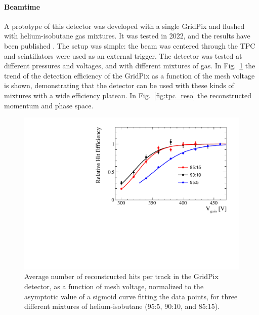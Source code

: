 \begin{refsection}
        \paragraph{Beamtime}
        A prototype of this detector was developed with a single GridPix and flushed with helium-isobutane gas mixtures. 
        It was tested in 2022, and the results have been published \cite{muEDM:PSI:GridPix}.
        The setup was simple: the beam was centered through the TPC and scintillators were used as an external trigger.
        The detector was tested at different pressures and voltages, and with different mixtures of gas.
        In Fig.~\ref{fig:gridpix_plateau} the trend of the detection efficiency of the GridPix as a function of the mesh voltage is shown, demonstrating that the detector can be used with these kinds of mixtures with a wide efficiency plateau.
        In Fig.~\ref{fig:tpc_reso} the reconstructed momentum and phase space.\\

        \begin{figure}
            \centering
            \includegraphics[width=0.5 \textwidth]{Figures/muEDM/gridpix_plateau.pdf}    
            \caption[muEDM: \grid efficiency]{Average number of reconstructed hits per track in the GridPix detector, as a function of mesh voltage, normalized to the asymptotic value of a sigmoid curve fitting the data points, for three different mixtures of helium-isobutane (95:5, 90:10, and 85:15).}
            \label{fig:gridpix_plateau}
        \end{figure}
        

\end{refsection}
